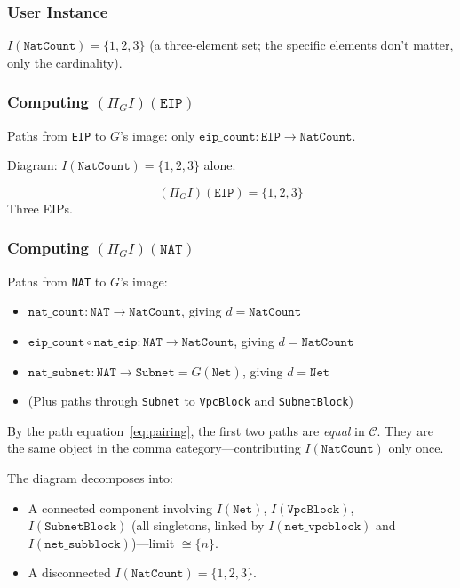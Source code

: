\documentclass[11pt,a4paper]{article}
\theoremstyle{definition}
\theoremstyle{plain}
\begin{document}
\subsubsection{User Instance}

$I(\texttt{NatCount}) = \{1, 2, 3\}$ (a three-element set; the specific elements don't matter, only the cardinality).

\subsubsection{Computing $(\Pi_G I)(\texttt{EIP})$}

Paths from \texttt{EIP} to $G$'s image: only $\texttt{eip\_count} \colon \texttt{EIP} \to \texttt{NatCount}$.

Diagram: $I(\texttt{NatCount}) = \{1, 2, 3\}$ alone.

\[
(\Pi_G I)(\texttt{EIP}) = \{1, 2, 3\}
\]
Three EIPs.

\subsubsection{Computing $(\Pi_G I)(\texttt{NAT})$}

Paths from \texttt{NAT} to $G$'s image:
\begin{itemize}
  \item $\texttt{nat\_count} \colon \texttt{NAT} \to \texttt{NatCount}$, giving $d = \texttt{NatCount}$
  \item $\texttt{eip\_count} \circ \texttt{nat\_eip} \colon \texttt{NAT} \to \texttt{NatCount}$, giving $d = \texttt{NatCount}$
  \item $\texttt{nat\_subnet} \colon \texttt{NAT} \to \texttt{Subnet} = G(\texttt{Net})$, giving $d = \texttt{Net}$
  \item (Plus paths through \texttt{Subnet} to \texttt{VpcBlock} and \texttt{SubnetBlock})
\end{itemize}

By the path equation~\eqref{eq:pairing}, the first two paths are \emph{equal} in $\mathcal{C}$. They are the same object in the comma category---contributing $I(\texttt{NatCount})$ only once.

The diagram decomposes into:
\begin{itemize}
  \item A connected component involving $I(\texttt{Net})$, $I(\texttt{VpcBlock})$, $I(\texttt{SubnetBlock})$ (all singletons, linked by $I(\texttt{net\_vpcblock})$ and $I(\texttt{net\_subblock})$)---limit $\cong \{n\}$.
  \item A disconnected $I(\texttt{NatCount}) = \{1,2,3\}$.
\end{itemize}
\end{document}
